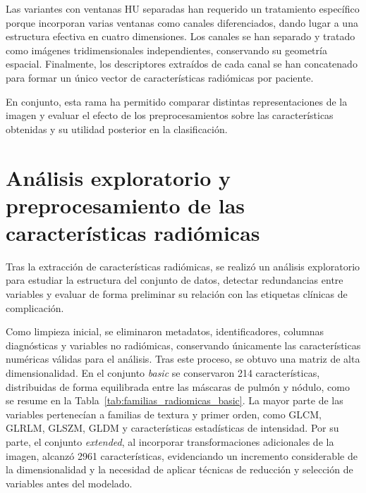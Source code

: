 Las variantes con ventanas HU separadas han requerido un tratamiento específico porque incorporan varias ventanas como canales diferenciados, dando lugar a una estructura efectiva en cuatro dimensiones. Los canales se han separado y tratado como imágenes tridimensionales independientes, conservando su geometría espacial. Finalmente, los descriptores extraídos de cada canal se han concatenado para formar un único vector de características radiómicas por paciente.

En conjunto, esta rama ha permitido comparar distintas representaciones de la imagen y evaluar el efecto de los preprocesamientos sobre las características obtenidas y su utilidad posterior en la clasificación.




\section{Análisis exploratorio y preprocesamiento de las características radiómicas}

Tras la extracción de características radiómicas, se realizó un análisis exploratorio para estudiar la estructura del conjunto de datos, detectar redundancias entre variables y evaluar de forma preliminar su relación con las etiquetas clínicas de complicación.

Como limpieza inicial, se eliminaron metadatos, identificadores, columnas diagnósticas y variables no radiómicas, conservando únicamente las características numéricas válidas para el análisis. Tras este proceso, se obtuvo una matriz de alta dimensionalidad. En el conjunto \textit{basic} se conservaron 214 características, distribuidas de forma equilibrada entre las máscaras de pulmón y nódulo, como se resume en la Tabla~\ref{tab:familias_radiomicas_basic}. La mayor parte de las variables pertenecían a familias de textura y primer orden, como GLCM, GLRLM, GLSZM, GLDM y características estadísticas de intensidad. Por su parte, el conjunto \textit{extended}, al incorporar transformaciones adicionales de la imagen, alcanzó 2961 características, evidenciando un incremento considerable de la dimensionalidad y la necesidad de aplicar técnicas de reducción y selección de variables antes del modelado.

